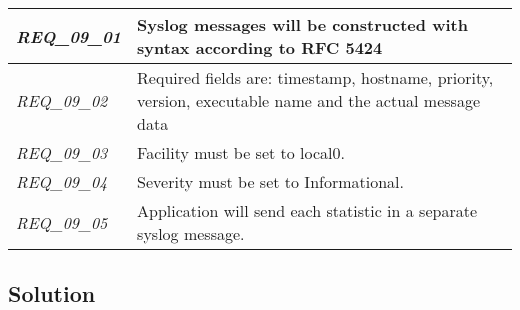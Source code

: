 \begin{table}[H]
{\begin{tabular}{@{}|l|l|@{}}
\textit{REQ\_09\_01} & Syslog messages will be constructed with syntax according to RFC 5424 \\ \midrule
\textit{REQ\_09\_02} & Required fields are: timestamp, hostname, priority, version, executable name and the actual message data \\ \midrule
\textit{REQ\_09\_03} & Facility must be set to local0. \\ \midrule
\textit{REQ\_09\_04} & Severity must be set to Informational. \\ \midrule
\textit{REQ\_09\_05} & Application will send each statistic in a separate syslog message. \\ \midrule

\end{tabular}%
}
\end{table}

\subsection{Solution}

